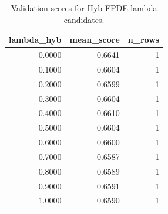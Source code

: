 \begin{table}[t]
\caption{Validation scores for Hyb-FPDE lambda candidates.}
\label{tab:lambda_distribution_computed}
\centering
\begin{tabular}{rrr}
\toprule
lambda\_hyb & mean\_score & n\_rows \\
\midrule
0.0000 & 0.6641 & 1 \\
0.1000 & 0.6604 & 1 \\
0.2000 & 0.6599 & 1 \\
0.3000 & 0.6604 & 1 \\
0.4000 & 0.6610 & 1 \\
0.5000 & 0.6604 & 1 \\
0.6000 & 0.6600 & 1 \\
0.7000 & 0.6587 & 1 \\
0.8000 & 0.6589 & 1 \\
0.9000 & 0.6591 & 1 \\
1.0000 & 0.6590 & 1 \\
\bottomrule
\end{tabular}

\end{table}
